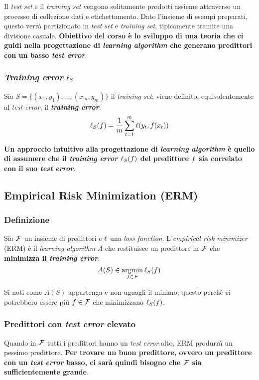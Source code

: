 \vspace{1em}

\begin{figure}[h]
    \centering
    
\end{figure}

Il \textit{test set} e il \textit{training set} vengono solitamente prodotti assieme
attraverso un processo di collezione dati e etichettamento. Dato l'insieme di esempi
preparati, questo verrà partizionato in \textit{test set} e \textit{training set},
tipicamente tramite una divisione casuale. \textbf{Obiettivo del corso è lo sviluppo
di una teoria che ci guidi nella progettazione di \textit{learning algorithm} che
generano predittori con un basso \textit{test error}}.

\subsubsection{\textit{Training error} \texorpdfstring{$\ell_S$}{l}}
Sia $S = \{(x_1,y_1),\dots,(x_m,y_m)\}$ il \textit{training set}; viene definito,
equivalentemente al \textit{test error}, il \textbf{\textit{training error}}:
$$ \ell_S(f) = \frac{1}{m}\sum_{t=1}^m \ell(y_t,f(x_t)) $$

\textbf{Un approccio intuitivo alla progettazione di \textit{learning algorithm} è 
quello di assumere che il \textit{training error} $\ell_S(f)$ del predittore 
$f$ sia correlato con il suo \textit{test error}}.

\subsection{Empirical Risk Minimization (ERM)}

\subsubsection{Definizione}
Sia $\mathcal{F}$ un insieme di predittori e $\ell$ una \textit{loss function}.
L'\textit{empirical risk minimizer} (ERM) è il \textit{learning algorithm} $A$
che restituisce un predittore in $\mathcal{F}$ che \textbf{minimizza il 
\textit{training error}}:
$$ A(S) \in \operatorname*{argmin}_{f \in \mathcal{F}} \ell_S(f) $$

Si noti come $A(S)$ appartenga e non uguagli il minimo; questo perchè ci 
potrebbero essere più $f \in \mathcal{F}$ che minimizzano $\ell_S(f)$.

\subsubsection{Predittori con \textit{test error} elevato}
Quando in $\mathcal{F}$ tutti i predittori hanno un \textit{test error} alto, ERM produrrà
un pessimo predittore. \textbf{Per trovare un buon predittore, ovvero un predittore
con un \textit{test error} basso, ci sarà quindi bisogno che $\mathcal{F}$ sia sufficientemente
grande}.

